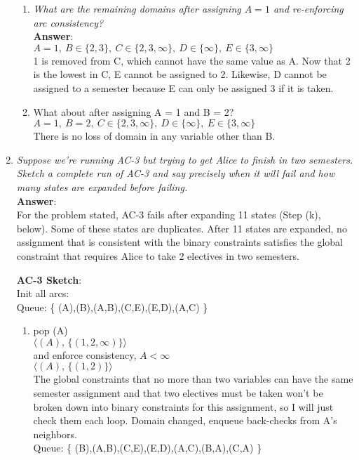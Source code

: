 \documentclass[fleqn]{hermans-hw}
\begin{document}
\begin{enumerate}
\begin{enumerate}
\item \textit{What are the remaining domains after assigning $A=1$ and
re-enforcing arc consistency?}\\
\textbf{Answer}:\\
$ A = 1, 
\ B \in \lbrace 2,3 \rbrace, 
\ C \in \lbrace 2,3,\infty \rbrace, 
\ D \in \lbrace \infty \rbrace, 
\ E \in \lbrace 3,\infty \rbrace$\\
1 is removed from C, which cannot have the same value as A. Now that 2 is the lowest in C, E cannot be assigned to 2. Likewise, D cannot be assigned to a semester because E can only be assigned 3 if it is taken.

\item What about after assigning A = 1 and B = 2?\\
$ A = 1, 
\ B = 2, 
\ C \in \lbrace 2,3,\infty \rbrace, 
\ D \in \lbrace \infty \rbrace, 
\ E \in \lbrace 3,\infty \rbrace$\\
There is no loss of domain in any variable other than B.
\end{enumerate}


\item  \textit{Suppose we're running AC-3 but
trying to get Alice to finish in two semesters.
Sketch a complete run of AC-3 and say precisely when it will fail and how many states are expanded before failing.} \\
\textbf{Answer}: \\
For the problem stated, AC-3 fails after expanding 11 states (Step (k), below).  Some of these states are duplicates.  After 11 states are expanded, no assignment that is consistent with the binary constraints satisfies the global constraint that requires Alice to take 2 electives in two semesters.

\textbf{AC-3 Sketch}: \\ Init all arcs:\\
Queue: \{ (A),(B),(A,B),(C,E),(E,D),(A,C) \}\\
\begin{enumerate}
	\item pop (A) \\
	$\langle(A), \, \lbrace (1,2,\infty) \rbrace \rangle$\\
	and enforce consistency, $A < \infty$ \\
	$\langle(A), \, \lbrace (1,2) \rbrace \rangle$\\
	The global constraints that no more than two variables can have the same semester assignment and that two electives must be taken won't be broken down into binary constraints for this assignment, so I will just check them each loop.
	Domain changed, enqueue back-checks from A's neighbors.\\
	Queue: \{ (B),(A,B),(C,E),(E,D),(A,C),(B,A),(C,A) \}\\
	

\end{enumerate}
\end{enumerate}
\end{document}
